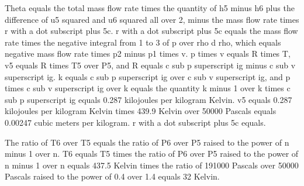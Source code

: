 Theta equals the total mass flow rate times the quantity of h5 minus h6 plus the difference of u5 squared and u6 squared all over 2, minus the mass flow rate times r with a dot subscript plus 5c. r with a dot subscript plus 5c equals the mass flow rate times the negative integral from 1 to 3 of p over rho d rho, which equals negative mass flow rate times p2 minus p1 times v. p times v equals R times T, v5 equals R times T5 over P5, and R equals c sub p superscript ig minus c sub v superscript ig. k equals c sub p superscript ig over c sub v superscript ig, and p times c sub v superscript ig over k equals the quantity k minus 1 over k times c sub p superscript ig equals 0.287 kilojoules per kilogram Kelvin. v5 equals 0.287 kilojoules per kilogram Kelvin times 439.9 Kelvin over 50000 Pascals equals 0.00247 cubic meters per kilogram. r with a dot subscript plus 5c equals.

The ratio of T6 over T5 equals the ratio of P6 over P5 raised to the power of n minus 1 over n. T6 equals T5 times the ratio of P6 over P5 raised to the power of n minus 1 over n equals 437.5 Kelvin times the ratio of 191000 Pascals over 50000 Pascals raised to the power of 0.4 over 1.4 equals 32 Kelvin.